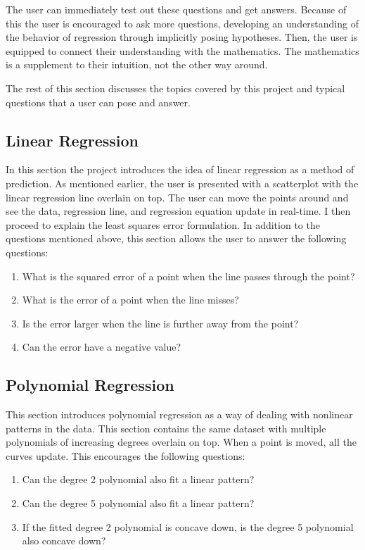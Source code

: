 \documentclass{acm_proc_article-sp}
\begin{document}
The user can immediately test out these questions and get answers. Because of
this the user is encouraged to ask more questions, developing an understanding
of the behavior of regression through implicitly posing hypotheses. Then, the
user is equipped to connect their understanding with the mathematics. The
mathematics is a supplement to their intuition, not the other way around.

The rest of this section discusses the topics covered by this project and
typical questions that a user can pose and answer.

\subsection{Linear Regression}

In this section the project introduces the idea of linear regression as a
method of prediction. As mentioned earlier, the user is presented with a
scatterplot with the linear regression line overlain on top. The user can move
the points around and see the data, regression line, and regression equation
update in real-time. I then proceed to explain the least squares error
formulation. In addition to the questions mentioned above, this section allows
the user to answer the following questions:

\begin{enumerate}
  \item What is the squared error of a point when the line passes through the
  point?
  \item What is the error of a point when the line misses?
  \item Is the error larger when the line is further away from the point?
  \item Can the error have a negative value?
\end{enumerate}

\subsection{Polynomial Regression}

This section introduces polynomial regression as a way of dealing with
nonlinear patterns in the data. This section contains the same dataset with
multiple polynomials of increasing degrees overlain on top. When a point is
moved, all the curves update. This encourages the following questions:

\begin{enumerate}
  \item Can the degree 2 polynomial also fit a linear pattern?
  \item Can the degree 5 polynomial also fit a linear pattern?
  \item If the fitted degree 2 polynomial is concave down, is the degree 5
  polynomial also concave down?
\end{enumerate}
\end{document}
